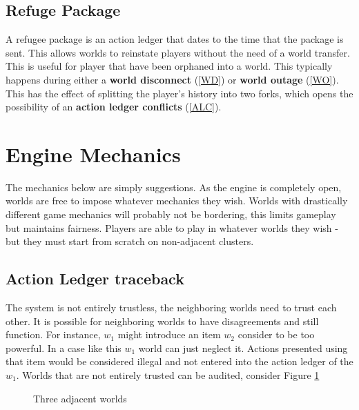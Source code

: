 \documentclass[runningheads,a4paper]{llncs}
\begin{document}
\subsection{Refuge Package}
\label{RP}
A refugee package is an action ledger that dates to the time that the package is sent. This allows worlds to reinstate players without the need of a world transfer. This is useful for player that have been orphaned into a world. This typically happens during either a \textbf{world disconnect} (\ref{WD}) or \textbf{world outage} (\ref{WO}). This has the effect of splitting the player's history into two forks, which opens the possibility of an \textbf{action ledger conflicts} (\ref{ALC}).

\section{Engine Mechanics} 
The mechanics below are simply suggestions. As the engine is completely open, worlds are free to impose whatever mechanics they wish. Worlds with drastically different game mechanics will probably not be bordering, this limits gameplay but maintains fairness. Players are able to play in whatever worlds they wish - but they must start from scratch on non-adjacent clusters.


\subsection{Action Ledger traceback}
\label{ALT}
The system is not entirely trustless, the neighboring worlds need to trust each other. It is possible for neighboring worlds to have disagreements and still function. For instance, $w_1$ might introduce an item $w_2$ consider to be too powerful. In a case like this $w_1$ world can just neglect it. Actions presented using that item would be considered illegal and not entered into the action ledger of the $w_1$. Worlds that are not entirely trusted can be audited, consider Figure \ref{ThreeW} 

\begin{figure}
\caption{Three adjacent worlds}
\label{ThreeW}
\begin{center}
\end{center}
\end{figure}
\end{document}
